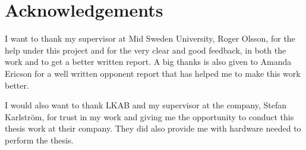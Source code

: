 \chapter*{Acknowledgements}
I want to thank my supervisor at Mid Sweden University, Roger Olsson, for the help under this project and for the very clear and good feedback, in both the work and to get a better written report.
A big thanks is also given to Amanda Ericson for a well written opponent report that has helped me to make this work better.

\bigskip

I would also want to thank LKAB and my supervisor at the company, Stefan Karlström, for trust in my work and giving me the opportunity to conduct this thesis work at their company. They did also provide me with hardware needed to perform the thesis.
